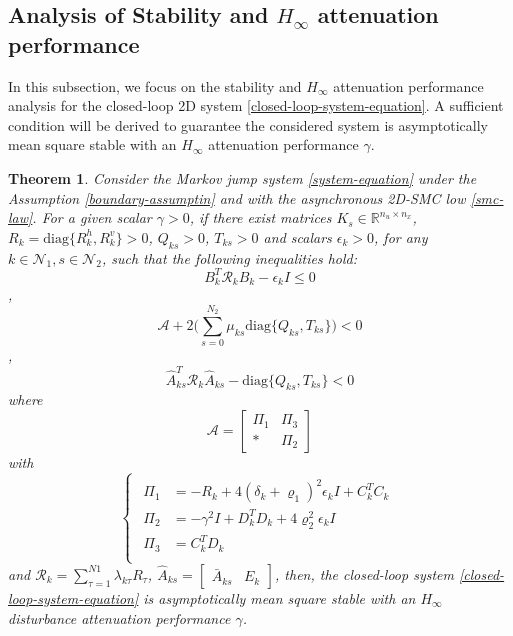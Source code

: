 \documentclass[conference]{IEEEtran}
\newtheorem{theorem}{Theorem}
\begin{document}
\subsection{Analysis of Stability and $H_{\infty}$ attenuation performance } \label{stability&H_infty}
 In this subsection, we focus on the stability and $H_{\infty}$ attenuation performance analysis for the closed-loop 2D system \eqref{closed-loop-system-equation}. A sufficient condition will be derived to guarantee the considered system is  asymptotically mean square stable with an $H_{\infty}$ attenuation performance $\gamma$.
\begin{theorem}
	Consider the  Markov jump system \eqref{system-equation} under the Assumption \eqref{boundary-assumptin} and with the asynchronous 2D-SMC low \eqref{smc-law}. For a given scalar $\gamma>0$, if there exist matrices $K_{s}\in\mathbb{R}^{n_u\times n_x}$,  $R_{k}=\mathrm{diag}\{R^{h}_{k},R^{v}_{k}\}>0$,  $Q_{ks}>0$, $T_{ks}>0$ and scalars $\epsilon_{k}>0$, for any $k\in\mathcal{N}_{1}, s\in\mathcal{N}_{2}$,  such that the following inequalities hold: 
	\begin{equation}\label{T1C1}
	B^{T}_{k}  	\mathcal{R}_{k} B_{k} -\epsilon_{k}I \leq 0
	\end{equation},
	\begin{equation}\label{T1C2}
	\mathcal{A} +2\Big(\sum_{s=0}^{N_{2}}\mu_{ks} \mathrm{diag}\{Q_{ks}, T_{ks}\}\Big) < 0
	\end{equation},
	\begin{equation}\label{T1C3}
	\hat{A}^{T}_{ks}\mathcal{R}_{k}\hat{A}_{ks} - \mathrm{diag}\{Q_{ks}, T_{ks}\} < 0
	\end{equation}
	where
	\begin{equation*}
	\mathcal{A}=\begin{bmatrix}
	\varPi_{1} & \varPi_{3}\\
	*&\varPi_{2}
	\end{bmatrix}
	\end{equation*} with
	\begin{equation*} \label{varPi}
	\left\{
	\begin{array}{lr}
	\begin{split}
	\varPi_{1}&=-R_{k}+4(\delta_{k}+\varrho_{1})^{2}\epsilon_{k}I+C^{T}_{k}C_{k}\\
	\varPi_{2}&=-\gamma^{2}I+D^{T}_{k}D_{k}+4\varrho_{2}^{2}\epsilon_{k}I\\
	\varPi_{3}&= C_{k}^{T}D_{k}\\
	\end{split}
	\end{array}
	\right.
	\end{equation*}
	and $\mathcal{R}_{k}=\sum_{\tau=1}^{N1}\lambda_{k\tau}R_{\tau}$, $\hat{A}_{ks}=\begin{bmatrix}
	\bar{A}_{ks}& E_{k}
	\end{bmatrix}$, 
	then, the closed-loop system \eqref{closed-loop-system-equation} is asymptotically mean square stable with an $H_{\infty}$ disturbance attenuation performance $\gamma$.
\end{theorem}
\end{document}
